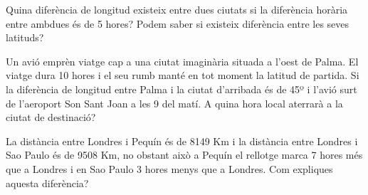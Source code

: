\begin{activitats}
 
\begin{mylist}
\exer Quina diferència de longitud existeix entre dues ciutats si la diferència horària entre ambdues és de 5 hores? Podem saber si existeix diferència entre les seves latituds?


\exer  Un avió emprèn viatge cap a una  ciutat imaginària situada a l'oest de Palma. El viatge dura 10 hores i el seu rumb manté en tot moment la latitud de partida. Si la diferència de longitud entre Palma i la ciutat d'arribada és de 45º i l'avió surt de l'aeroport Son Sant Joan a les 9 del matí. A quina hora local aterrarà a la ciutat de destinació?


\exer  La distància entre Londres i Pequín és de 8149 Km i la distància entre Londres i Sao Paulo és de 9508 Km, no obstant això a Pequín el rellotge marca 7 hores més que a Londres i en Sao Paulo 3 hores menys que a Londres. Com expliques aquesta diferència?



\end{mylist}
\end{activitats}

